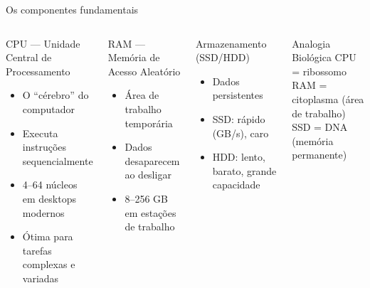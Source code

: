 \begin{frame}[shrink=5]{Os componentes fundamentais}
\begin{columns}
\begin{block}{CPU — Unidade Central de Processamento}
\begin{itemize}
    \item O ``cérebro'' do computador
    \item Executa instruções sequencialmente
    \item 4–64 núcleos em desktops modernos
    \item Ótima para tarefas complexas e variadas
\end{itemize}
\end{block}
\vspace{0.4cm}
\begin{block}{RAM — Memória de Acesso Aleatório}
\begin{itemize}
    \item Área de trabalho temporária
    \item Dados desaparecem ao desligar
    \item 8–256 GB em estações de trabalho
\end{itemize}
\end{block}

\begin{block}{Armazenamento (SSD/HDD)}
\begin{itemize}
    \item Dados persistentes
    \item SSD: rápido (GB/s), caro
    \item HDD: lento, barato, grande capacidade
\end{itemize}
\end{block}
\vspace{0.4cm}
\begin{exampleblock}{Analogia Biológica}
CPU = ribossomo\\
RAM = citoplasma (área de trabalho)\\
SSD = DNA (memória permanente)
\end{exampleblock}
\end{columns}
\end{frame}


